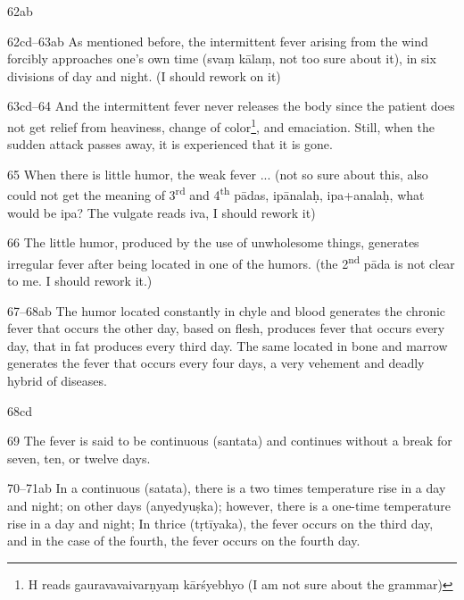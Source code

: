 \begin{translation}
   \item[62ab]  
    
    \item[62cd--63ab]  As mentioned before, the intermittent fever arising from 
the
    wind forcibly approaches one's own time (svaṃ kālaṃ, not too sure about
    it), in six divisions of day and night. (I should rework on it)
    
    \item[63cd--64]  And the intermittent fever never releases the body since the
    patient does not get relief from heaviness, change of 
    color\footnote{
        H reads gauravavaivarṇyaṃ kārśyebhyo (I am not sure about the 
grammar)
    }, and emaciation. Still, when the sudden attack passes
    away, it is experienced that it is gone.
    
    
    \item[65]  When there is little humor, the weak fever ... (not so sure about
    this, also could not get the meaning of 3\textsuperscript{rd} and
    4\textsuperscript{th} pādas, ipānalaḥ, ipa+analaḥ, what would be ipa?
    The vulgate reads iva, I should rework it)
    
    \item[66]  The little humor, produced by the use of unwholesome things,
    generates irregular fever after being located in one of the humors. (the
    2\textsuperscript{nd} pāda is not clear to me. I should rework it.)
    
    
    \item[67--68ab]  The humor located constantly in chyle and blood generates 
the
    chronic fever that occurs the other day, based on flesh, produces fever
    that occurs every day, that in fat produces every third day. The same
    located in bone and marrow generates the fever that occurs every four
    days, a very vehement and deadly hybrid of diseases.
    
   \item[68cd]  
    
    \item[69]  The fever is said to be continuous (santata) and continues without 
a
    break for seven, ten, or twelve days.
    
    
    \item[70--71ab]  In a continuous (satata), there is a two times temperature 
rise
    in a day and night; on other days (anyedyuṣka); however, there is a
    one-time temperature rise in a day and night; In thrice (tṛtīyaka), the
    fever occurs on the third day, and in the case of the fourth, the fever
    occurs on the fourth day.
    

\end{translation}
